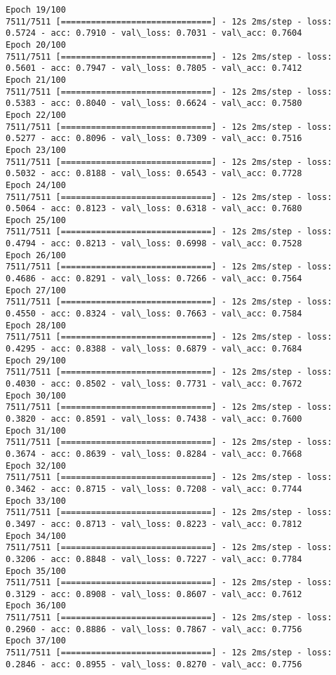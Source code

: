 \documentclass[11pt]{article}
\begin{document}
\begin{Verbatim}[commandchars=\\\{\}]
Epoch 19/100
7511/7511 [==============================] - 12s 2ms/step - loss: 0.5724 - acc: 0.7910 - val\_loss: 0.7031 - val\_acc: 0.7604
Epoch 20/100
7511/7511 [==============================] - 12s 2ms/step - loss: 0.5601 - acc: 0.7947 - val\_loss: 0.7805 - val\_acc: 0.7412
Epoch 21/100
7511/7511 [==============================] - 12s 2ms/step - loss: 0.5383 - acc: 0.8040 - val\_loss: 0.6624 - val\_acc: 0.7580
Epoch 22/100
7511/7511 [==============================] - 12s 2ms/step - loss: 0.5277 - acc: 0.8096 - val\_loss: 0.7309 - val\_acc: 0.7516
Epoch 23/100
7511/7511 [==============================] - 12s 2ms/step - loss: 0.5032 - acc: 0.8188 - val\_loss: 0.6543 - val\_acc: 0.7728
Epoch 24/100
7511/7511 [==============================] - 12s 2ms/step - loss: 0.5064 - acc: 0.8123 - val\_loss: 0.6318 - val\_acc: 0.7680
Epoch 25/100
7511/7511 [==============================] - 12s 2ms/step - loss: 0.4794 - acc: 0.8213 - val\_loss: 0.6998 - val\_acc: 0.7528
Epoch 26/100
7511/7511 [==============================] - 12s 2ms/step - loss: 0.4686 - acc: 0.8291 - val\_loss: 0.7266 - val\_acc: 0.7564
Epoch 27/100
7511/7511 [==============================] - 12s 2ms/step - loss: 0.4550 - acc: 0.8324 - val\_loss: 0.7663 - val\_acc: 0.7584
Epoch 28/100
7511/7511 [==============================] - 12s 2ms/step - loss: 0.4295 - acc: 0.8388 - val\_loss: 0.6879 - val\_acc: 0.7684
Epoch 29/100
7511/7511 [==============================] - 12s 2ms/step - loss: 0.4030 - acc: 0.8502 - val\_loss: 0.7731 - val\_acc: 0.7672
Epoch 30/100
7511/7511 [==============================] - 12s 2ms/step - loss: 0.3820 - acc: 0.8591 - val\_loss: 0.7438 - val\_acc: 0.7600
Epoch 31/100
7511/7511 [==============================] - 12s 2ms/step - loss: 0.3674 - acc: 0.8639 - val\_loss: 0.8284 - val\_acc: 0.7668
Epoch 32/100
7511/7511 [==============================] - 12s 2ms/step - loss: 0.3462 - acc: 0.8715 - val\_loss: 0.7208 - val\_acc: 0.7744
Epoch 33/100
7511/7511 [==============================] - 12s 2ms/step - loss: 0.3497 - acc: 0.8713 - val\_loss: 0.8223 - val\_acc: 0.7812
Epoch 34/100
7511/7511 [==============================] - 12s 2ms/step - loss: 0.3206 - acc: 0.8848 - val\_loss: 0.7227 - val\_acc: 0.7784
Epoch 35/100
7511/7511 [==============================] - 12s 2ms/step - loss: 0.3129 - acc: 0.8908 - val\_loss: 0.8607 - val\_acc: 0.7612
Epoch 36/100
7511/7511 [==============================] - 12s 2ms/step - loss: 0.2960 - acc: 0.8886 - val\_loss: 0.7867 - val\_acc: 0.7756
Epoch 37/100
7511/7511 [==============================] - 12s 2ms/step - loss: 0.2846 - acc: 0.8955 - val\_loss: 0.8270 - val\_acc: 0.7756

\end{Verbatim}
\end{document}
